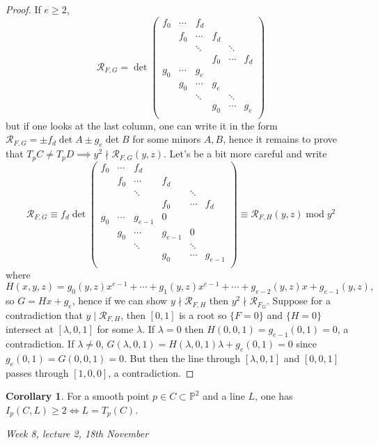 \documentclass{article}
\newcommand{\p}{\mathbb{P}}
\newcommand{\Mod}{\operatorname{mod}}
\newcommand{\re}{\mathcal{R}}
\theoremstyle{definition}
\newtheorem{coro}[defn]{Corollary}
\begin{document}
\begin{proof}
If $e\geq 2$,
\[
\re_{F,G}=\det\begin{pmatrix}
f_0 & \cdots & f_d \\
& f_0 & \cdots & f_d \\
& & \ddots & & \ddots \\
& & & f_0 & \cdots & f_d \\
g_0 & \cdots & g_e \\
& g_0 & \cdots & g_e \\
& & \ddots & & \ddots \\
& & & g_0 & \cdots & g_e \\
\end{pmatrix}
\]
but if one looks at the last column, one can write it in the form $\re_{F,G}=\pm f_d\det A\pm g_e\det B$ for some minors $A,B$, hence it remains to prove that $T_pC\neq T_pD\implies y^2\nmid\re_{F,G}(y,z)$. Let's be a bit more careful and write
\[
\re_{F,G}\equiv f_d\det\begin{pmatrix}
f_0 & \cdots & f_d \\
& f_0 & \cdots & f_d \\
& & \ddots & & \ddots \\
& & & f_0 & \cdots & f_d \\
g_0 & \cdots & g_{e-1} & 0 \\
& g_0 & \cdots & g_{e-1} & 0 \\
& & \ddots & & \ddots \\
& & & g_0 & \cdots & g_{e-1} \\
\end{pmatrix}\equiv \re_{F,H}(y,z)\Mod y^2
\]
where
\[
H(x,y,z)=g_0(y,z)x^{e-1}+\cdots+g_1(y,z)x^{e-1}+\cdots+g_{e-2}(y,z)x+g_{e-1}(y,z),
\]
so $G=Hx+g_e$, hence if we can show $y\nmid \re_{F,H}$ then $y^2\nmid\re_{F_G}$. Suppose for a contradiction that $y\mid \re_{F,H}$, then $[0,1]$ is a root so $\{F=0\}$ and $\{H=0\}$ intersect at $[\lambda,0,1]$ for some $\lambda$. If $\lambda=0$ then $H(0,0,1)=g_{e-1}(0,1)=0$, a contradiction. If $\lambda\neq 0$, $G(\lambda,0,1)=H(\lambda,0,1)\lambda+g_e(0,1)=0$ since $g_e(0,1)=G(0,0,1)=0$. But then the line through $[\lambda,0,1]$ and $[0,0,1]$ passes through $[1,0,0]$, a contradiction.
\end{proof}

\begin{coro}
For a smooth point $p\in C\subset\p^2$ and a line $L$, one has $I_p(C,L)\geq 2\iff L=T_p(C)$.
\end{coro}

\begin{flushright}
\textit{Week 8, lecture 2, 18th November}
\end{flushright}
\end{document}
